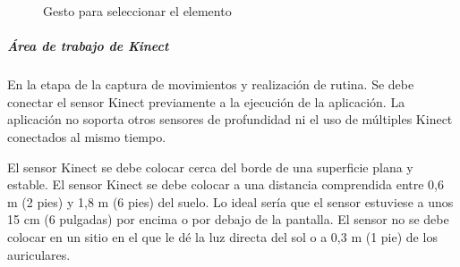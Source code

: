 \begin{figure}[H]
	\centering
	\caption{Gesto para seleccionar el elemento}
	\label{fig:Gesto-SeleccionarINU}
\end{figure}

\subparagraph{Área de trabajo de Kinect} \hspace{1cm}
\vspace{0.5cm}

En la etapa de la captura de movimientos y realización de rutina. Se debe conectar el sensor Kinect previamente a la ejecución de la aplicación. La aplicación no soporta otros sensores de profundidad ni el uso de múltiples Kinect conectados al mismo tiempo. 

El sensor Kinect se debe colocar cerca del borde de una superficie plana y estable.
El sensor Kinect se debe colocar a una distancia comprendida entre 0,6 m (2 pies) y 1,8 m (6 pies) del suelo. Lo ideal sería que el sensor estuviese a unos 15 cm (6 pulgadas) por encima o por debajo de la pantalla.
El sensor no se debe colocar en un sitio en el que le dé la luz directa del sol o a 0,3 m (1 pie) de los auriculares.

